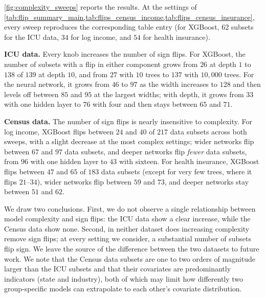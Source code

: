 \cref{fig:complexity_sweeps} reports the results. At the settings of \cref{tab:flip_summary_main,tab:flips_census_income,tab:flips_census_insurance}, every sweep reproduces the corresponding table entry (for XGBoost, $62$ subsets for the ICU data, $34$ for log income, and $54$ for health insurance).

\textbf{ICU data.} Every knob increases the number of sign flips. For XGBoost, the number of subsets with a flip in either component grows from $26$ at depth $1$ to $138$ of $139$ at depth $10$, and from $27$ with $10$ trees to $137$ with $10{,}000$ trees. For the neural network, it grows from $46$ to $97$ as the width increases to $128$ and then levels off between $85$ and $95$ at the largest widths; with depth, it grows from $33$ with one hidden layer to $76$ with four and then stays between $65$ and $71$.

\textbf{Census data.} The number of sign flips is nearly insensitive to complexity. For log income, XGBoost flips between $24$ and $40$ of $217$ data subsets across both sweeps, with a slight decrease at the most complex settings; wider networks flip between $67$ and $97$ data subsets, and deeper networks flip \emph{fewer} data subsets, from $96$ with one hidden layer to $43$ with sixteen. For health insurance, XGBoost flips between $47$ and $65$ of $183$ data subsets (except for very few trees, where it flips $21$--$34$), wider networks flip between $59$ and $73$, and deeper networks stay between $51$ and $62$.

We draw two conclusions. First, we do not observe a single relationship between model complexity and sign flips: the ICU data show a clear increase, while the Census data show none. Second, in neither dataset does increasing complexity remove sign flips; at every setting we consider, a substantial number of subsets flip sign. We leave the source of the difference between the two datasets to future work. We note that the Census data subsets are one to two orders of magnitude larger than the ICU subsets and that their covariates are predominantly indicators (state and industry), both of which may limit how differently two group-specific models can extrapolate to each other's covariate distribution.


